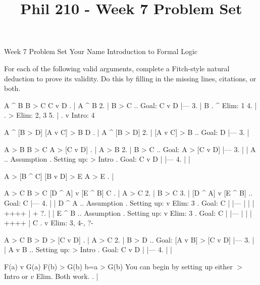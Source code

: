
\title{Phil 210 - Week 7 Problem Set}

\heading
Week 7 Problem Set
Your Name
Introduction to Formal Logic
\endheading

For each of the following valid arguments, complete a Fitch-style natural deduction to prove its validity. Do this by filling in the missing lines, citations, or both.

\problems
{}
\argument
 A ^ B
 B > C
\argumentline
 C v D
\endargument
	\answer
	. | A ^ B
	 2. | B > C  ..  Goal: C v D
	    |---
	 3. | B      .  ^ Elim: 1
	 4. |        .  > Elim: 2, 3
	 5. |        .  v Intro: 4
	\endfitchproof
	\endanswer

\argument
 A ^ [B > D]
 [A v C] > B
\argumentline
 D
\endargument
	\answer
	. | A ^ [B > D]
	 2. | [A v C] > B  ..  Goal: D
	    |---
	 3. | 
	\endfitchproof
	\endanswer

\argument
 A > B
 B > C
\argumentline
 A > [C v D]
\endargument
	\answer
	. | A > B
	 2. | B > C         ..  Goal: A > [C v D]
	    |---
	 3. |  | A          ..  Assumption  .  Setting up: > Intro  .  Goal: C v D
	    |  |---
	 4. |  | 
	\endfitchproof
	\endanswer

\argument
 A > [B ^ C]
 [B v D] > E
\argumentline
 A > E
\endargument
	\answer
	. | 
	\endfitchproof
	\endanswer

\widerfitchsetup %
\argument
 A > C
 B > C
 [D ^ A] v [E ^ B]
\argumentline
 C
\endargument
	\answer
	. | A > C
	 2. | B > C
	 3. | [D ^ A] v [E ^ B]  ..  Goal: C
	    |---
	 4. |  | D ^ A  ..  Assumption  .  Setting up: v Elim: 3  .  Goal: C
	    |  |---
	    |  | 
	    |  ++++
	    |  +
	 ?. |  | E ^ B  ..  Assumption  .  Setting up: v Elim: 3  .  Goal: C
	    |  |---
	    |  | 
	    |  ++++
	    | C         .  v Elim: 3, 4-, ?-
	\endfitchproof
	\endanswer

\argument
 A > C
 B > D
\argumentline
 [A v B] > [C v D]
\endargument
	\answer
	. | A > C
	 2. | B > D        ..  Goal: [A v B] > [C v D]
	    |---
	 3. |  | A v B     ..  Setting up: > Intro    .  Goal: C v D
	    |  |---
	 4. |  | 
	\endfitchproof
	\endanswer

\argument
 F(a) v G(a)
 F(b) > G(b)
\argumentline
 b=a > G(b)
\endargument
\Hint You can begin by setting up either $>$ Intro or $v$ Elim. Both work.
	\answer
	. | 
	\endfitchproof
	\endanswer

